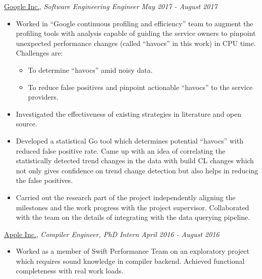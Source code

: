 \documentclass[9pt]{article}
\newenvironment{changemargin}[2]{%
  \begin{list}{}{%
    \setlength{\topsep}{0pt}%
    \setlength{\leftmargin}{#1}%
    \setlength{\rightmargin}{#2}%
    \setlength{\listparindent}{\parindent}%
    \setlength{\itemindent}{\parindent}%
    \setlength{\parsep}{\parskip}%
  }%
  \item[]}{\end{list}
}
\newenvironment{body} {
	\vspace*{-16pt}
	\begin{changemargin}{-0.25in}{-0.5in}
  }	
	{\end{changemargin}
}
\begin{document}
\begin{body}
\begin{itemize}
\begin{itemize}
			\end{itemize}

	\end{itemize}

	\vspace*{-4pt}

	\href{https://www.google.com/intl/en/about/}{Google Inc.}, \emph{Software Engineering Engineer} \hfill \emph{May 2017 - August 2017}\\
	\vspace*{-4pt}
	\begin{itemize} \itemsep -0pt
		\item  Worked in ``Google continuous profiling and efficiency'' team to augment the
			profiling tools with analysis capable of
			guiding the service owners to pinpoint unexpected
			performance changes (called ``havocs'' in this work) in CPU time. Challenges are:
			\begin{itemize}
				\item To determine ``havocs'' amid noisy data.
				\item To reduce false positives and pinpoint actionable ``havocs'' to the service providers.
			\end{itemize}
		\item Investigated the effectiveness of existing strategies in literature and open source.
		\item
			Developed a statistical Go tool which determines
			potential ``havocs'' with reduced false positive rate.
			Came up with an idea of correlating the
			statistically detected trend changes in the data with
			build CL changes which not only gives confidence on
			trend change detection but also helps in reducing the
			false positives.

		\item Carried out the research part of the project
			independently aligning the milestones and the work
			progress with the project supervisor. Collaborated with
			the team on the details of integrating with the data
			querying pipeline.
	\end{itemize}

	\vspace*{-4pt}
	\href{http://www.apple.com}{Apple Inc.}, \emph{Compiler Engineer, PhD Intern} \hfill \emph{April 2016 - August 2016}\\
	\vspace*{-4pt}
	\begin{itemize} \itemsep -0pt  %
                \item  Worked as a member of Swift Performance Team on an
                  exploratory project which requires sound knowledge in
                  compiler backend. Achieved functional completeness with real
                  work loads.
                \end{itemize}


\end{body}
\end{document}
